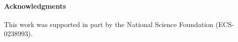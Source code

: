 \documentclass[conference]{IEEEtran}
\begin{document}

\paragraph{Acknowledgments} This work was supported in part by the National
Science Foundation (ECS-0238993).



\end{document}
